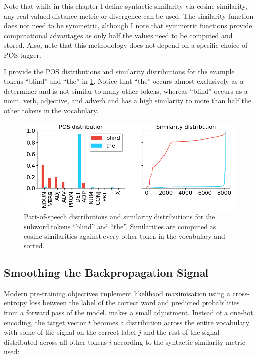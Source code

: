 Note that while in this chapter I define syntactic similarity via cosine similarity, any real-valued distance metric or divergence can be used. The similarity function does not need to be symmetric, although I note that symmetric functions provide computational advantages as only half the values need to be computed and stored. Also, note that this methodology does not depend on a specific choice of POS tagger.

I provide the POS distributions and similarity distributions for the example tokens ``blind'' and ``the'' in \cref{fig:distributions}. Notice that ``the'' occurs almost exclusively as a determiner and is not similar to many other tokens, whereas ``blind'' occurs as a noun, verb, adjective, and adverb and has a high similarity to more than half the other tokens in the vocabulary.

\begin{figure}[ht!]
    \centering
    \includegraphics[width=0.8\linewidth]{chapters/syntatic-smoothing/figures/distributions.png}
    \caption{Part-of-speech distributions and similarity distributions for the subword tokens ``blind'' and ``the''. Similarities are computed as cosine-similarities against every other token in the vocabulary and sorted.}
    \label{fig:distributions}
    \vspace{-1em}
\end{figure}

\subsection{Smoothing the Backpropagation Signal}\label{section:smoothing}

Modern pre-training objectives implement likelihood maximisation using a cross-entropy loss between the label of the correct word and predicted probabilities from a forward pass of the model. \smoothing makes a small adjustment. Instead of a one-hot encoding, the target vector $t$ becomes a distribution across the entire vocabulary with some of the signal on the correct label $j$ and the rest of the signal distributed across all other tokens $i$ according to the syntactic similarity metric used:


